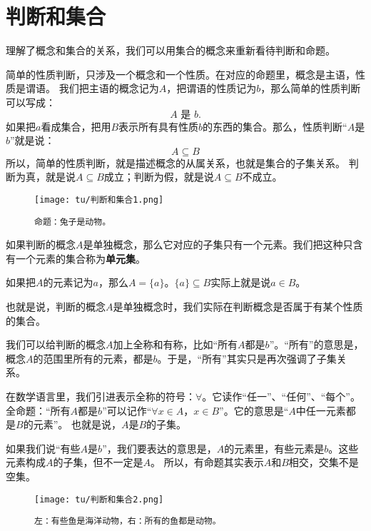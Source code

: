\documentclass[12pt,UTF8]{ctexbook}
\theoremstyle{definition}
\theoremstyle{plain}
\begin{document}
\section{判断和集合}
理解了概念和集合的关系，我们可以用集合的概念来重新看待判断和命题。

简单的性质判断，只涉及一个概念和一个性质。在对应的命题里，概念是主语，性质是谓语。
我们把主语的概念记为$A$，把谓语的性质记为$b$，那么简单的性质判断可以写成：
$$ A \,\,\mbox{是} \,\,b. $$
如果把$a$看成集合，把用$B$表示所有具有性质$b$的东西的集合。那么，性质判断“$A$是$b$”就是说：
$$A \subseteq B$$
所以，简单的性质判断，就是描述概念的从属关系，也就是集合的子集关系。
判断为真，就是说$A \subseteq B$成立；判断为假，就是说$A \subseteq B$不成立。

\begin{wrapfigure}[5]{r}{0.26\textwidth} %
    \vspace{-32pt}
    \flushright
    \texttt{[image: tu/判断和集合1.png]}
    \caption*{\texttt{命题：兔子是动物。}}
\end{wrapfigure}

如果判断的概念$A$是单独概念，那么它对应的子集只有一个元素。我们把这种只含有一个元素的集合称为\textbf{单元集}。

如果把$A$的元素记为$a$，那么$A = \{a\}$。$\{a\} \subseteq B$实际上就是说$a\in B$。

也就是说，判断的概念$A$是单独概念时，我们实际在判断概念是否属于有某个性质的集合。

我们可以给判断的概念$A$加上全称和有称，比如“所有$A$都是$b$”。“所有”的意思是，
概念$A$的范围里所有的元素，都是$b$。于是，“所有”其实只是再次强调了子集关系。

在数学语言里，我们引进表示全称的符号：$\forall$。它读作“任一”、“任何”、“每个”。
全命题：“所有$A$都是$b$”可以记作“$\forall x \in A$，$x \in B$”。它的意思是“$A$中任一元素都是$B$的元素”。
也就是说，$A$是$B$的子集。

如果我们说“有些$A$是$b$”，我们要表达的意思是，$A$的元素里，有些元素是$b$。这些元素构成$A$的子集，但不一定是$A$。
所以，有命题其实表示$A$和$B$相交，交集不是空集。

\begin{figure}[h]
    \vspace{4pt}
    \centering
    \texttt{[image: tu/判断和集合2.png]}
    \captionsetup{justification=centering}
    \caption*{\texttt{左：有些鱼是海洋动物，右：所有的鱼都是动物。}}
\end{figure}
\end{document}
